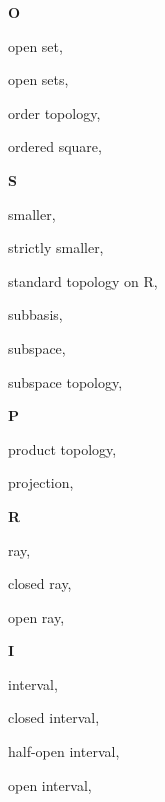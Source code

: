 \begin{multicols}{2}
\vspace{1em}\large{\textbf{O}}

open set, \pageref{def:OpenSet}

open sets, \pageref{def:OpenSets}

order topology, \pageref{def:OrderTopology}

ordered square, \pageref{def:OrderedSquare}

\vspace{1em}\large{\textbf{S}}

smaller, \pageref{def:Comparable}

\hspace{2em}strictly smaller, \pageref{def:Comparable}

standard topology on R, \pageref{def:StandardTopologyOnTheRealLine}

subbasis, \pageref{def:Subbasis}

subspace, \pageref{def:SubspaceTopology}

subspace topology, \pageref{def:SubspaceTopology}

\vspace{1em}\large{\textbf{P}}

product topology, \pageref{def:ProductTopology}

projection, \pageref{def:Projection}

\vspace{1em}\large{\textbf{R}}

ray, \pageref{def:Ray}

\hspace{2em}closed ray, \pageref{def:Ray}

\hspace{2em}open ray, \pageref{def:Ray}

\vspace{1em}\large{\textbf{I}}

interval, \pageref{def:Interval}

\hspace{2em}closed interval, \pageref{def:Interval}

\hspace{2em}half-open interval, \pageref{def:Interval}

\hspace{2em}open interval, \pageref{def:Interval}

\end{multicols}